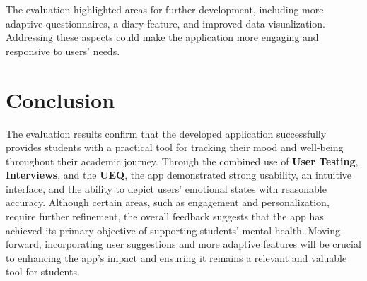 The evaluation highlighted areas for further development, including more adaptive questionnaires, a diary feature, and improved data visualization. Addressing these aspects could make the application more engaging and responsive to users’ needs.

\section{Conclusion}

The evaluation results confirm that the developed application successfully provides students with a practical tool for tracking their mood and well-being throughout their academic journey. Through the combined use of \textbf{User Testing}, \textbf{Interviews}, and the \textbf{UEQ}, the app demonstrated strong usability, an intuitive interface, and the ability to depict users' emotional states with reasonable accuracy. Although certain areas, such as engagement and personalization, require further refinement, the overall feedback suggests that the app has achieved its primary objective of supporting students' mental health. Moving forward, incorporating user suggestions and more adaptive features will be crucial to enhancing the app's impact and ensuring it remains a relevant and valuable tool for students.
